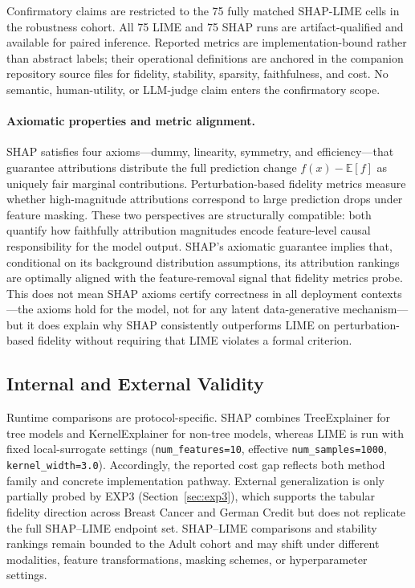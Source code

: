 \documentclass[twoside,11pt]{article}
\begin{document}
Confirmatory claims are restricted to the 75 fully matched SHAP-LIME
cells in the robustness cohort. All 75 LIME and 75 SHAP runs are artifact-qualified and available
for paired inference. Reported metrics are implementation-bound
rather than abstract labels; their operational definitions are anchored
in the companion repository source files for fidelity, stability,
sparsity, faithfulness, and cost. No semantic, human-utility, or
LLM-judge claim enters the confirmatory scope.

\paragraph{Axiomatic properties and metric alignment.}
SHAP satisfies four axioms---dummy, linearity, symmetry, and efficiency---that
guarantee attributions distribute the full prediction change $f(x) -
\mathbb{E}[f]$ as uniquely fair marginal contributions.
Perturbation-based fidelity metrics measure whether high-magnitude attributions
correspond to large prediction drops under feature masking.
These two perspectives are structurally compatible: both quantify how faithfully
attribution magnitudes encode feature-level causal responsibility for the model
output. SHAP's axiomatic guarantee implies that, conditional on its background
distribution assumptions, its attribution rankings are optimally aligned with
the feature-removal signal that fidelity metrics probe. This does not mean SHAP
axioms certify correctness in all deployment contexts---the axioms hold for the
model, not for any latent data-generative mechanism---but it does explain why
SHAP consistently outperforms LIME on perturbation-based fidelity without
requiring that LIME violates a formal criterion.

\subsection{Internal and External Validity}

Runtime comparisons are protocol-specific. SHAP combines TreeExplainer
for tree models and KernelExplainer for non-tree models, whereas LIME is
run with fixed local-surrogate settings (\texttt{num\_features=10},
effective \texttt{num\_samples=1000}, \texttt{kernel\_width=3.0}).
Accordingly, the reported cost gap reflects both method family and
concrete implementation pathway. External generalization is only partially
probed by EXP3 (Section~\ref{sec:exp3}), which supports the tabular
fidelity direction across Breast Cancer and German Credit but does not
replicate the full SHAP--LIME endpoint set. SHAP--LIME comparisons and
stability rankings remain bounded to the Adult cohort and may shift under
different modalities, feature transformations, masking schemes, or
hyperparameter settings.
\end{document}
